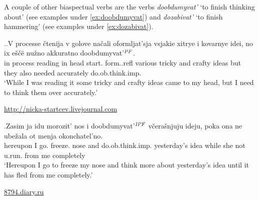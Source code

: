 A couple of other biaspectual verbs are the verbs \textit{doobdumyvat'} `to finish thinking about' (see examples under \ref{ex:doobdumyvat}) and \textit{dozabivat'} `to finish hammering' (see examples under \ref{ex:dozabivat}).

\ex.\label{ex:doobdumyvat}\ag.V processe \v{c}tenija v golove na\v{c}ali oformljat'sja vsjakie xitrye i kovarnye idei, no ix e\v{s}\v{c}\"{e} nu\v{z}no akkuratno doobdumyvat'$^{\mathit{PF}}$.\\
in process reading in head start. form..refl various tricky and crafty ideas but they also needed accurately do.ob.think.imp.\\
\vspace{0.5em}
`While I was reading it some tricky and crafty ideas came to my head, but I need to think them over accurately.'
\begin{flushright}
\vspace{-0.5em}
\url{http://nicka-startcev.livejournal.com}
\end{flushright}
\bg.Zasim ja idu morozit' nos i doobdumyvat'$^{\mathit{IPF}}$ v\v{c}era\v{s}njuju ideju, poka ona ne ube\v{z}ala ot menja okonchatel'no.\\
hereupon I go. freeze. nose and do.ob.think.imp. yesterday's idea while she not u.run. from me completely\\
\vspace{0.5em}
`Hereupon I go to freeze my nose and think more about yesterday's idea until it has fled from me completely.'
\begin{flushright}
\vspace{-0.5em}
\url{8794.diary.ru}
\end{flushright}

